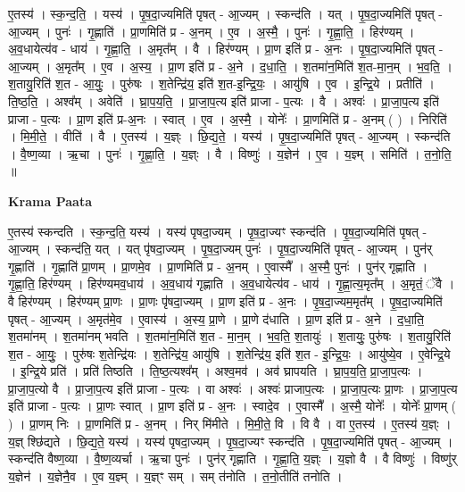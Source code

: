 \documentclass[17pt]{extarticle}
\begin{document}
ए॒तस्य॑ । स्क॒न्द॒ति॒ । यस्य॑ । पृ॒ष॒दा॒ज्यमिति॑ पृषत् - आ॒ज्यम् । स्कन्द॑ति । यत् । पृ॒ष॒दा॒ज्यमिति॑ पृषत् - आ॒ज्यम् । पुनः॑ । गृ॒ह्णाति॑ । प्रा॒णमिति॑ प्र - अ॒नम् । ए॒व । अ॒स्मै॒ । पुनः॑ । गृ॒ह्णा॒ति॒ । हिर॑ण्यम् । अ॒व॒धायेत्य॑व - धाय॑ । गृ॒ह्णा॒ति॒ । अ॒मृत᳚म् । वै । हिर॑ण्यम् । प्रा॒ण इति॑ प्र - अ॒नः । पृ॒ष॒दा॒ज्यमिति॑ पृषत् - आ॒ज्यम् । अ॒मृत᳚म् । ए॒व । अ॒स्य॒ । प्रा॒ण इति॑ प्र - अ॒ने । द॒धा॒ति॒ । श॒तमा॑न॒मिति॑ श॒त-मा॒न॒म् । भ॒व॒ति॒ । श॒तायु॒रिति॑ श॒त - आ॒युः॒ । पुरु॑षः । श॒तेन्द्रि॑य॒ इति॑ श॒त-इ॒न्द्रि॒यः॒ । आयु॑षि । ए॒व । इ॒न्द्रि॒ये । प्रतीति॑ । ति॒ष्ठ॒ति॒ । अश्व᳚म् । अवेति॑ । घ्रा॒प॒य॒ति॒ । प्रा॒जा॒प॒त्य इति॑ प्राजा - प॒त्यः । वै । अश्वः॑ । प्रा॒जा॒प॒त्य इति॑ प्राजा - प॒त्यः । प्रा॒ण इति॑ प्र-अ॒नः । स्वात् । ए॒व । अ॒स्मै॒ । योनेः᳚ । प्रा॒णमिति॑ प्र - अ॒नम् ( ) । निरिति॑ । मि॒मी॒ते॒ । वीति॑ । वै । ए॒तस्य॑ । य॒ज्ञ्ः । छि॒द्य॒ते॒ । यस्य॑ । पृ॒ष॒दा॒ज्यमिति॑ पृषत् - आ॒ज्यम् । स्कन्द॑ति । वै॒ष्ण॒व्या । ऋ॒चा । पुनः॑ । गृ॒ह्णा॒ति॒ । य॒ज्ञ्ः । वै । विष्णुः॑ । य॒ज्ञेन॑ । ए॒व । य॒ज्ञ्म् । समिति॑ । त॒नो॒ति॒ ॥  \newline


\textbf{Krama Paata} \newline

ए॒तस्य॑ स्कन्दति । स्क॒न्द॒ति॒ यस्य॑ । यस्य॑ पृषदा॒ज्यम् । पृ॒ष॒दा॒ज्यꣳ स्कन्द॑ति । पृ॒ष॒दा॒ज्यमिति॑ पृषत् - आ॒ज्यम् । स्कन्द॑ति॒ यत् । यत् पृ॑षदा॒ज्यम् । पृ॒ष॒दा॒ज्यम् पुनः॑ । पृ॒ष॒दा॒ज्यमिति॑ पृषत् - आ॒ज्यम् । पुन॑र् गृ॒ह्णाति॑ । गृ॒ह्णाति॑ प्रा॒णम् । प्रा॒णमे॒व । प्रा॒णमिति॑ प्र - अ॒नम् । ए॒वास्मै᳚ । अ॒स्मै॒ पुनः॑ । पुन॑र् गृह्णाति । गृ॒ह्णा॒ति॒ हिर॑ण्यम् । हिर॑ण्यमव॒धाय॑ । अ॒व॒धाय॑ गृह्णाति । अ॒व॒धायेत्य॑व - धाय॑ । गृ॒ह्णा॒त्य॒मृत᳚म् । अ॒मृतं॒ ॅवै । वै हिर॑ण्यम् । हिर॑ण्यम् प्रा॒णः । प्रा॒णः पृ॑षदा॒ज्यम् । प्रा॒ण इति॑ प्र - अ॒नः । पृ॒ष॒दा॒ज्यम॒मृत᳚म् । पृ॒ष॒दा॒ज्यमिति॑ पृषत् - आ॒ज्यम् । अ॒मृत॑मे॒व । ए॒वास्य॑ । अ॒स्य॒ प्रा॒णे । प्रा॒णे द॑धाति । प्रा॒ण इति॑ प्र - अ॒ने । द॒धा॒ति॒ श॒तमा॑नम् । श॒तमा॑नम् भवति । श॒तमा॑न॒मिति॑ श॒त - मा॒न॒म् । भ॒व॒ति॒ श॒तायुः॑ । श॒तायुः॒ पुरु॑षः । श॒तायु॒रिति॑ श॒त - आ॒युः॒ । पुरु॑षः श॒तेन्द्रि॑यः । श॒तेन्द्रि॑य॒ आयु॑षि । श॒तेन्द्रि॑य॒ इति॑ श॒त - इ॒न्द्रि॒यः॒ । आयु॑ष्ये॒व । ए॒वेन्द्रि॒ये । इ॒न्द्रि॒ये प्रति॑ । प्रति॑ तिष्ठति । ति॒ष्ठ॒त्यश्व᳚म् । अश्व॒मव॑ । अव॑ घ्रापयति । घ्रा॒प॒य॒ति॒ प्रा॒जा॒प॒त्यः । प्रा॒जा॒प॒त्यो वै । प्रा॒जा॒प॒त्य इति॑ प्राजा - प॒त्यः । वा अश्वः॑ । अश्वः॑ प्राजाप॒त्यः । प्रा॒जा॒प॒त्यः प्रा॒णः । प्रा॒जा॒प॒त्य इति॑ प्राजा - प॒त्यः । प्रा॒णः स्वात् । प्रा॒ण इति॑ प्र - अ॒नः । स्वादे॒व । ए॒वास्मै᳚ । अ॒स्मै॒ योनेः᳚ । योनेः᳚ प्रा॒णम् ( ) । प्रा॒णम् निः । प्रा॒णमिति॑ प्र - अ॒नम् । निर् मि॑मीते । मि॒मी॒ते॒ वि । वि वै । वा ए॒तस्य॑ । ए॒तस्य॑ य॒ज्ञ्ः । य॒ज्ञ् श्छि॑द्यते । छि॒द्य॒ते॒ यस्य॑ । यस्य॑ पृषदा॒ज्यम् । पृ॒ष॒दा॒ज्यꣳ स्कन्द॑ति । पृ॒ष॒दा॒ज्यमिति॑ पृषत् - आ॒ज्यम् । स्कन्द॑ति वैष्ण॒व्या । वै॒ष्ण॒व्यर्चा । ऋ॒चा पुनः॑ । पुन॑र् गृह्णाति । गृ॒ह्णा॒ति॒ य॒ज्ञ्ः । य॒ज्ञो वै । वै विष्णुः॑ । विष्णु॑र् य॒ज्ञेन॑ । य॒ज्ञेनै॒व । ए॒व य॒ज्ञ्म् । य॒ज्ञ्ꣳ सम् । सम् त॑नोति । त॒नो॒तीति॑ तनोति । \newline
\end{document}
